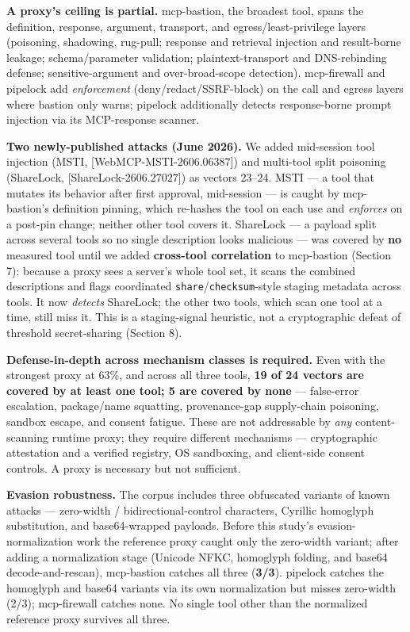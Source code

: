 \documentclass[
]{article}
\newcounter{none} %
\begin{document}
\textbf{A proxy's ceiling is partial.} mcp-bastion, the broadest tool,
spans the definition, response, argument, transport, and
egress/least-privilege layers (poisoning, shadowing, rug-pull; response
and retrieval injection and result-borne leakage; schema/parameter
validation; plaintext-transport and DNS-rebinding defense;
sensitive-argument and over-broad-scope detection). mcp-firewall and
pipelock add \emph{enforcement} (deny/redact/SSRF-block) on the call and
egress layers where bastion only warns; pipelock additionally detects
response-borne prompt injection via its MCP-response scanner.

\textbf{Two newly-published attacks (June 2026).} We added mid-session
tool injection (MSTI, {[}WebMCP-MSTI-2606.06387{]}) and multi-tool split
poisoning (ShareLock, {[}ShareLock-2606.27027{]}) as vectors 23--24.
MSTI --- a tool that mutates its behavior after first approval,
mid-session --- is caught by mcp-bastion's definition pinning, which
re-hashes the tool on each use and \emph{enforces} on a post-pin change;
neither other tool covers it. ShareLock --- a payload split across
several tools so no single description looks malicious --- was covered
by \textbf{no} measured tool until we added \textbf{cross-tool
correlation} to mcp-bastion (Section 7): because a proxy sees a server's
whole tool set, it scans the combined descriptions and flags coordinated
\texttt{share}/\texttt{checksum}-style staging metadata across tools. It
now \emph{detects} ShareLock; the other two tools, which scan one tool
at a time, still miss it. This is a staging-signal heuristic, not a
cryptographic defeat of threshold secret-sharing (Section 8).

\textbf{Defense-in-depth across mechanism classes is required.} Even
with the strongest proxy at 63\%, and across all three tools, \textbf{19
of 24 vectors are covered by at least one tool; 5 are covered by none}
--- false-error escalation, package/name squatting, provenance-gap
supply-chain poisoning, sandbox escape, and consent fatigue. These are
not addressable by \emph{any} content-scanning runtime proxy; they
require different mechanisms --- cryptographic attestation and a
verified registry, OS sandboxing, and client-side consent controls. A
proxy is necessary but not sufficient.

\textbf{Evasion robustness.} The corpus includes three obfuscated
variants of known attacks --- zero-width / bidirectional-control
characters, Cyrillic homoglyph substitution, and base64-wrapped
payloads. Before this study's evasion-normalization work the reference
proxy caught only the zero-width variant; after adding a normalization
stage (Unicode NFKC, homoglyph folding, and base64 decode-and-rescan),
mcp-bastion catches all three (\textbf{3/3}). pipelock catches the
homoglyph and base64 variants via its own normalization but misses
zero-width (2/3); mcp-firewall catches none. No single tool other than
the normalized reference proxy survives all three.
\end{document}
